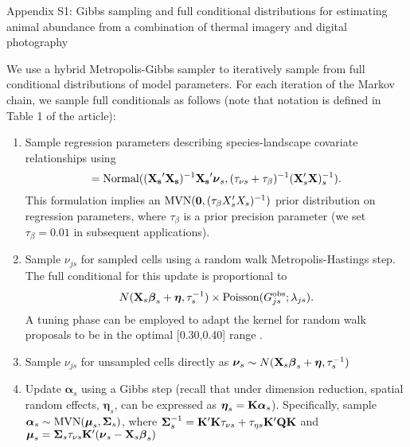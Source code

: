 \documentclass[12pt,fleqn]{article}
\begin{document}
\rm \begin{flushleft}

\raggedbottom

\begin{center}
Appendix S1: Gibbs sampling and full conditional distributions for estimating animal abundance
from a combination of thermal imagery and digital photography
\bigskip
\end{center}

We use a hybrid Metropolis-Gibbs sampler \citep[cf.][]{GelmanEtAl2004} to iteratively sample from full conditional distributions
of model parameters.  For each iteration of the Markov chain, we sample full conditionals as follows (note that notation is defined in Table 1 of the article):

\begin{enumerate}
  \item Sample regression parameters describing species-landscape covariate relationships using
  \begin{equation*}
  [\boldsymbol{\beta}_s|\hdots]={\rm Normal}(({\bf X_s}^\prime {\bf X_s})^{-1}{\bf X_s}^\prime \boldsymbol{\nu}_s,(\tau_{\nu s}+\tau_\beta)^{-1}({\bf X}_s^\prime {\bf X})_s^{-1}).
  \end{equation*}
  This formulation implies an ${\rm MVN}({\bf 0},(\tau_\beta X_s^\prime X_s)^{-1})$ prior distribution
  on regression parameters, where $\tau_\beta$ is a prior precision parameter (we set $\tau_\beta=0.01$ in subsequent applications). \\

  \item Sample $\nu_{js}$ for sampled cells using a random walk Metropolis-Hastings step.  The full conditional
  for this update is proportional to
  \begin{equation*}
  N({\bf X}_s \boldsymbol{\beta}_s + \boldsymbol{\eta},\tau_s^{-1})\times
    {\rm Poisson}(G_{js}^{\rm obs};\lambda_{js}).
  \end{equation*} 
  A tuning phase can be employed to adapt the kernel for random walk proposals to be in the optimal [0.30,0.40] range \citep{GelmanEtAl2004}.
  \\

  \item Sample $\nu_{js}$ for unsampled cells directly as
    $\boldsymbol{\nu}_{s} \sim N({\bf X}_s \boldsymbol{\beta}_s + \boldsymbol{\eta},\tau_s^{-1})$ \\

  \item Update $\boldsymbol{\alpha}_s$ using a Gibbs step (recall that under dimension reduction, spatial random effects, $\boldsymbol{\eta}_s$, can be expressed as $\boldsymbol{\eta}_s={\bf K}\boldsymbol{\alpha}_s$).  Specifically, sample $\boldsymbol{\alpha}_s \sim {\rm MVN}(\boldsymbol{\mu}_s,\boldsymbol{\Sigma}_s)$, where $\boldsymbol{\Sigma}_s^{-1}={\bf K}^\prime {\bf K}\tau_{\nu s}+\tau_{\eta s}{\bf K}^\prime {\bf Q} {\bf K}$ and $\boldsymbol{\mu}_s=\boldsymbol{\Sigma}_s \tau_{\nu s} {\bf K}^\prime (\boldsymbol{\nu}_s - {\bf X}_s \boldsymbol{\beta}_s) $ \\


\end{enumerate}
\end{flushleft}
\end{document}
